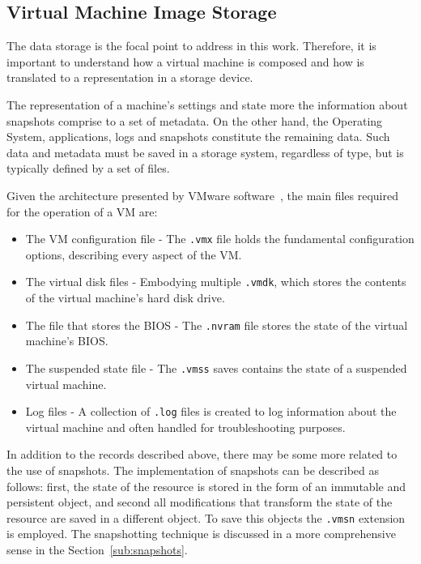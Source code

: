 \nocite{Nuno2016}
\nocite{Eduardo2016}
\nocite{P2020}



\subsection{Virtual Machine Image Storage} %
\label{sub:vm_storage}

The data storage is the focal point to address in this work. Therefore, it is important to understand how a virtual machine is composed and how is translated to a representation in a storage device.

The representation of a machine's settings and state more the information about snapshots comprise to a set of metadata. On the other hand, the Operating System, applications, logs and snapshots constitute the remaining data. Such data and metadata must be saved in a storage system, regardless of type, but is typically defined by a set of files. 

Given the architecture presented by VMware software~\cite{VMWare_VMFiles}, the main files required for the operation of a VM are:

\begin{itemize}
	\item The VM configuration file - The \texttt{.vmx} file holds the fundamental configuration options, describing every aspect of the VM.
	\item The virtual disk files - Embodying multiple \texttt{.vmdk}, which stores the contents of the virtual machine's hard disk drive.
	\item The file that stores the BIOS - The \texttt{.nvram} file stores the state of the virtual machine's BIOS.
	\item The suspended state file - The \texttt{.vmss} saves contains the state of a suspended virtual machine.
	\item Log files - A collection of \texttt{.log} files is created to log information about the virtual machine and often handled for troubleshooting purposes.
\end{itemize}


In addition to the records described above, there may be some more related to the use of snapshots. The implementation of snapshots can be described as follows: first, the state of the resource is stored in the form of an immutable and persistent object, and second all modifications that transform the state of the resource are saved in a different object. To save this objects the \texttt{.vmsn} extension is employed.
The snapshotting technique is discussed in a more comprehensive sense in the Section~\ref{sub:snapshots}.

